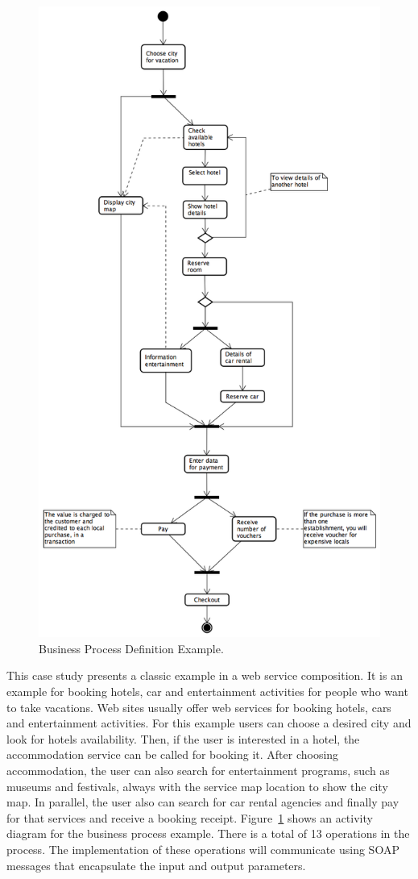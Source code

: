 \documentclass{sig-alternate}
\begin{document}
\begin{figure}
\centering

\includegraphics[width=.5\textwidth]{figs/proofConcept.png}

\caption{Business Process Definition Example.}
\label{fig:example}
\end{figure}

This case study presents a classic example in a web service composition. It
is an example for booking hotels, car and entertainment activities for people
who want to take vacations. Web sites usually offer web services for booking hotels, cars and entertainment activities. For this example users can choose a desired city and look for
hotels availability. Then, if the user is interested in a
hotel, the accommodation service can be called for booking it. After
choosing  accommodation, the user can also search for entertainment
programs, such as museums and festivals, always with the service map
location to show the city map. In parallel, the user also can search for car
rental agencies and finally pay for that services and receive a
booking receipt. Figure~\ref{fig:example} shows an activity diagram for the business process example.
There is a total of 13 operations in the process.
The implementation of these operations will communicate using SOAP messages that encapsulate the input
and output parameters.
\end{document}
